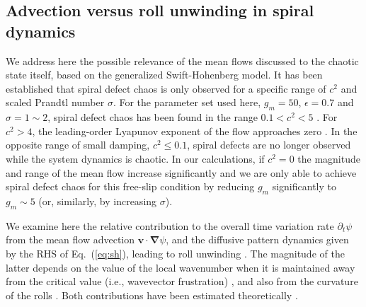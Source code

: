 \documentclass[preprint,prx,floatfix]{revtex4-1}
\begin{document}
\subsection{Advection versus roll unwinding in spiral dynamics}
\label{sec:adv}

We address here the possible relevance of the mean flows discussed to the chaotic state itself, based on the generalized Swift-Hohenberg model. It has been established that spiral defect chaos is only observed for a specific range of $c^2$ and scaled Prandtl number $\sigma$. For the parameter set used here, $g_m = 50$, $\epsilon = 0.7$ and $\sigma = 1\sim2$, spiral defect chaos has been found in the range $0.1 < c^2 < 5$ \cite{karimi2011exploring,xi1993spiral,cross1996theoretical}. For $c^2 > 4$, the leading-order Lyapunov exponent of the flow approaches zero \cite{karimi2011exploring}. In the opposite range of small damping, $c^2 \leq 0.1$, spiral defects are no longer observed while the system dynamics is chaotic. In our calculations, if $c^2 = 0$ the magnitude and range of the mean flow increase significantly and we are only able to achieve spiral defect chaos for this free-slip condition by reducing $g_m$ significantly to $g_m \sim 5$ (or, similarly, by increasing $\sigma$).

We examine here the relative contribution to the overall time variation rate $\partial_{t} \psi$ from the mean flow advection $\mathbf{v}\cdot\bm{\nabla}\psi$, and the diffusive pattern dynamics given by the RHS of Eq.~(\ref{eq:sh}), leading to roll unwinding \cite{cross1984convection,cross1996theoretical}. The magnitude of the latter depends on the value of the local wavenumber when it is maintained away from the critical value (i.e., wavevector frustration) \cite{cross1996theoretical,re:huang07}, and also from the curvature of the rolls \cite{vitral2019role}. Both contributions have been estimated theoretically \cite{cross1986wavebumber,cross1996theoretical}. 
\end{document}
